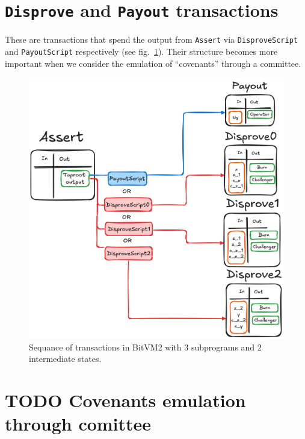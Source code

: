 \documentclass{iacrtrans}
\begin{document}
\section{\texttt{Disprove} and \texttt{Payout}
transactions}\label{sec:disprove-payout-txs}

These are transactions that spend the output from \texttt{Assert} via
\texttt{DisproveScript} and \texttt{PayoutScript} respectively (see
fig.~\ref{fig:bitvm-txs}). Their structure becomes more important when
we consider the emulation of ``covenants'' through a committee.

\begin{figure}[htbp]
  \centering
  \includegraphics[width=.9\linewidth]{../images/bitvm-txs.png}
  \caption{\label{fig:bitvm-txs}Sequance of transactions in BitVM2
  with 3 subprograms and 2 intermediate states.}
\end{figure}

\section{{\bfseries\sffamily TODO} Covenants emulation through
comittee}\label{sec:covenants-emulation}

\printbibliography{}
\end{document}

